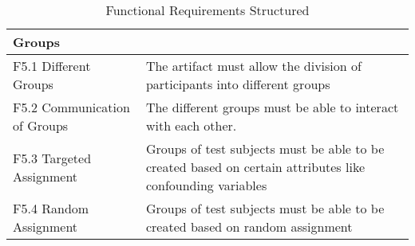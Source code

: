 \begin{table}
\begin{tabular}{L{0.35\textwidth}L{0.59\textwidth}}
    Groups                      &             \\ \hline
    F5.1 Different Groups           & The artifact must allow the division of participants into different groups            \\
    F5.2 Communication of Groups    & The different groups must be able to interact with each other.            \\ 
    F5.3 Targeted Assignment        & Groups of test subjects must be able to be created based on certain attributes like confounding variables \\
    F5.4 Random Assignment          & Groups of test subjects must be able to be created based on random assignment \\ \hline
    \end{tabular}
    \caption[Functional Requirements Structured]{Functional Requirements Structured}\label{tab:FuncRequirementsCat}
    \end{table}


